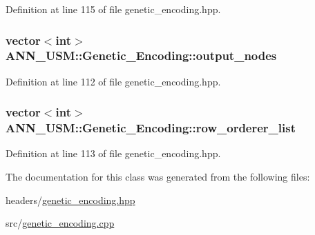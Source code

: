 Definition at line 115 of file genetic\-\_\-encoding.\-hpp.

\hypertarget{class_a_n_n___u_s_m_1_1_genetic___encoding_a66ce2a57061f434146f6a797105ea96f}{
\subsubsection[{output\-\_\-nodes}]{\setlength{\rightskip}{0pt plus 5cm}vector$<$int$>$ A\-N\-N\-\_\-\-U\-S\-M\-::\-Genetic\-\_\-\-Encoding\-::output\-\_\-nodes}}\label{class_a_n_n___u_s_m_1_1_genetic___encoding_a66ce2a57061f434146f6a797105ea96f}


Definition at line 112 of file genetic\-\_\-encoding.\-hpp.

\hypertarget{class_a_n_n___u_s_m_1_1_genetic___encoding_a410de772c609b972f6ec913e81b7d797}{
\subsubsection[{row\-\_\-orderer\-\_\-list}]{\setlength{\rightskip}{0pt plus 5cm}vector$<$int$>$ A\-N\-N\-\_\-\-U\-S\-M\-::\-Genetic\-\_\-\-Encoding\-::row\-\_\-orderer\-\_\-list}}\label{class_a_n_n___u_s_m_1_1_genetic___encoding_a410de772c609b972f6ec913e81b7d797}


Definition at line 113 of file genetic\-\_\-encoding.\-hpp.



The documentation for this class was generated from the following files\-:\begin{DoxyCompactItemize}
\item 
headers/\hyperlink{genetic__encoding_8hpp}{genetic\-\_\-encoding.\-hpp}\item 
src/\hyperlink{genetic__encoding_8cpp}{genetic\-\_\-encoding.\-cpp}\end{DoxyCompactItemize}
